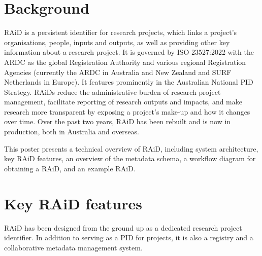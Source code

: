 \documentclass[a0,portrait]{a0poster}
\begin{document}
\setlength{\columnsep}{2cm}
\begin{multicols}{2}

\color{ARDCPink}
\section*{\LARGE Background}
\color{DarkGrey}
\large{
RAiD is a persistent identifier for research projects, which links a project’s organisations, people, inputs and outputs, as well as providing other key information about a research project. It is governed by ISO 23527:2022 with the ARDC as the global Registration Authority and various regional Registration Agencies (currently the ARDC in Australia and New Zealand and SURF Netherlands in Europe). It features prominently in the Australian National PID Strategy. RAiDs reduce the administrative burden of research project management, facilitate reporting of research outputs and impacts, and make research more transparent by exposing a project’s make-up and how it changes over time. Over the past two years, RAiD has been rebuilt and is now in production, both in Australia and overseas. 

This poster presents a technical overview of RAiD, including system architecture, key RAiD features, an overview of the metadata schema, a workflow diagram for obtaining a RAiD, and an example RAiD.
}


\color{ARDCYellow}
\section*{\LARGE Key RAiD features}
\color{DarkGrey}
\large{
RAiD has been designed from the ground up as a dedicated research project identifier. In addition to serving as a PID for projects, it is also a registry and a collaborative metadata management system.
}

\vspace{2cm}



\color{ARDCYellow}

\end{multicols}
\end{document}
